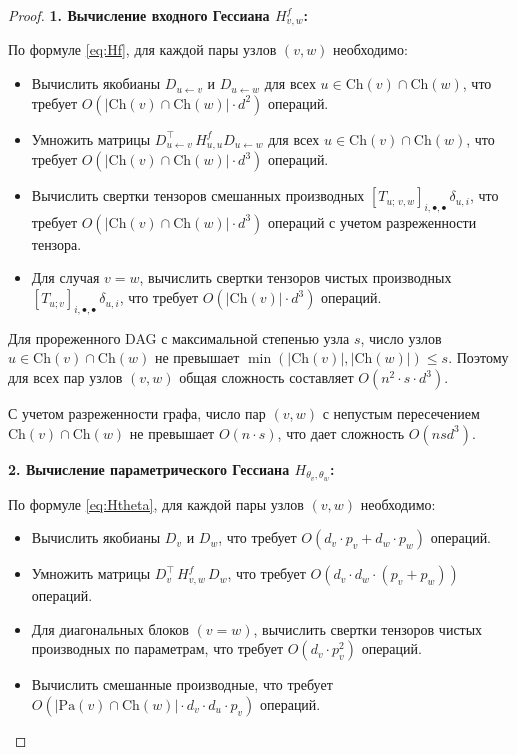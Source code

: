 \documentclass[11pt]{article}
\newcommand{\Pa}{\mathrm{Pa}} %
\newcommand{\Ch}{\mathrm{Ch}} %
\begin{document}
\begin{proof}
  \textbf{1. Вычисление входного Гессиана $H^f_{v,w}$:}

  По формуле \eqref{eq:Hf}, для каждой пары узлов $(v,w)$ необходимо:
  \begin{itemize}
    \item Вычислить якобианы $D_{u\gets v}$ и $D_{u\gets w}$ для всех $u \in \Ch(v) \cap \Ch(w)$, что требует
      $O(|\Ch(v) \cap \Ch(w)| \cdot d^2)$ операций.
    \item Умножить матрицы $D_{u\gets v}^\top\,H^f_{u,u} D_{u\gets w}$ для всех $u \in \Ch(v) \cap \Ch(w)$,
      что требует $O(|\Ch(v) \cap \Ch(w)| \cdot d^3)$ операций.
    \item Вычислить свертки тензоров смешанных производных $[T_{u;\,v,w}]_{i,\bullet,\bullet}\,\delta_{u,i}$,
      что требует $O(|\Ch(v) \cap \Ch(w)| \cdot d^3)$ операций с учетом разреженности тензора.
    \item Для случая $v=w$, вычислить свертки тензоров чистых производных
      $[T_{u;v}]_{i,\bullet,\bullet}\,\delta_{u,i}$, что требует $O(|\Ch(v)| \cdot d^3)$ операций.
  \end{itemize}

  Для прореженного DAG с максимальной степенью узла $s$, число узлов $u \in \Ch(v) \cap \Ch(w)$ не превышает
  $\min(|\Ch(v)|, |\Ch(w)|) \leq s$. Поэтому для всех пар узлов $(v,w)$ общая сложность составляет $O(n^2
  \cdot s \cdot d^3)$.

  С учетом разреженности графа, число пар $(v,w)$ с непустым пересечением $\Ch(v) \cap \Ch(w)$ не превышает
  $O(n \cdot s)$, что дает сложность $O(n s d^3)$.

  \textbf{2. Вычисление параметрического Гессиана $H_{\theta_v,\theta_w}$:}

  По формуле \eqref{eq:Htheta}, для каждой пары узлов $(v,w)$ необходимо:
  \begin{itemize}
    \item Вычислить якобианы $D_v$ и $D_w$, что требует $O(d_v \cdot p_v + d_w \cdot p_w)$ операций.
    \item Умножить матрицы $D_v^\top\,H^f_{v,w}\,D_w$, что требует $O(d_v \cdot d_w \cdot (p_v + p_w))$ операций.
    \item Для диагональных блоков $(v=w)$, вычислить свертки тензоров чистых производных по параметрам, что
      требует $O(d_v \cdot p_v^2)$ операций.
    \item Вычислить смешанные производные, что требует $O(|\Pa(v) \cap \Ch(w)| \cdot d_v \cdot d_u \cdot p_v)$ операций.
  \end{itemize}


\end{proof}
\end{document}
